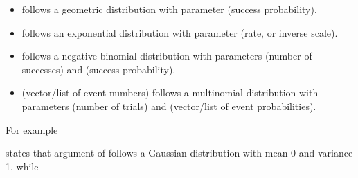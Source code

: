 \documentclass[letterpaper,10pt,english]{sphinxmanual}
\begin{document}
\begin{itemize}
\item {} 
\sphinxAtStartPar
{}  follows a geometric distribution with parameter  (success probability).

\item {} 
\sphinxAtStartPar
{}  follows an exponential distribution with parameter  (rate, or inverse scale).

\item {} 
\sphinxAtStartPar
{}  follows a negative binomial distribution with parameters  (number of successes) and  (success probability).

\item {} 
\sphinxAtStartPar
{}  (vector/list of event numbers) follows a multinomial distribution with parameters  (number of trials) and  (vector/list of event probabilities).

\end{itemize}

\sphinxAtStartPar
For example

\begin{sphinxVerbatim}[commandchars=\\\{\}]
  
\end{sphinxVerbatim}

\sphinxAtStartPar
states that argument  of  follows a Gaussian distribution with mean 0 and variance 1, while

\begin{sphinxVerbatim}[commandchars=\\\{\}]
 \PYG{p}{[}\PYG{p}{]} \PYG{p}{[}\PYG{p}{[}\PYG{p}{]}\PYG{p}{[}\PYG{p}{]}\PYG{p}{]}
\end{sphinxVerbatim}
\end{document}
